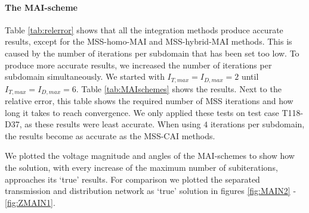\documentclass[10pt,journal]{article}
\begin{document}

\paragraph{The MAI-scheme}
Table \ref{tab:relerror} shows that all the integration methods produce accurate results, except for the MSS-homo-MAI and MSS-hybrid-MAI methods. This is caused by the number of iterations per subdomain that has been set too low. To produce more accurate results, we increased the number of iterations per subdomain simultaneously. We started with $I_{T,max}=I_{D,max}=2$ until $I_{T,max}=I_{D,max}=6$.  Table \ref{tab:MAIschemes} shows the results. Next to the relative error, this table shows the required number of MSS iterations and how long it takes to reach convergence. We only applied these tests on test case T118-D37, as these results were least accurate. When using $4$ iterations per subdomain, the results become as accurate as the MSS-CAI methods. 

We plotted the voltage magnitude and angles of the MAI-schemes to show how the solution, with every increase of the maximum number of subiterations, approaches its `true' results. For comparison we plotted the separated transmission and distribution network as `true' solution in figures \ref{fig:MAIN2} - \ref{fig:ZMAIN1}. 
\end{document}
